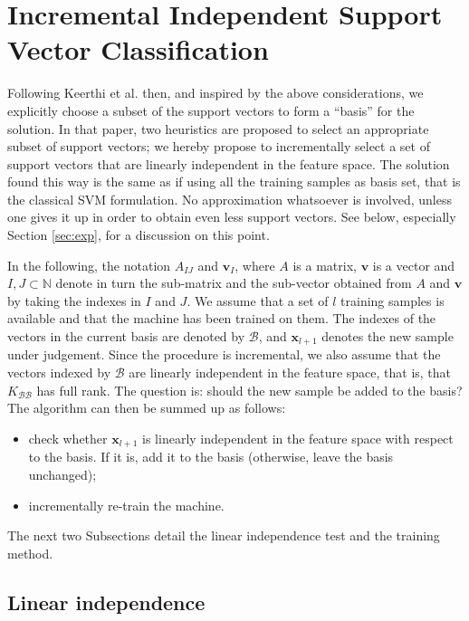 \documentclass[10pt,twocolumn,letterpaper]{article}
\def\NN{\mathbb{N}}
\def\xx{\mathbf{x}}
\def\b{\mathcal{B}}
\begin{document}
\section{Incremental Independent Support Vector Classification}
\label{sec:opt}

Following Keerthi et al. \cite{KeerthiCDC06} then, and inspired by the
above considerations, we explicitly choose a subset of the support
vectors to form a ``basis'' for the solution. In that paper, two
heuristics are proposed to select an appropriate subset of support
vectors; we hereby propose to incrementally select a set of support
vectors that are linearly independent in the feature space. The
solution found this way is the same as if using all the training
samples as basis set, that is the classical SVM formulation. No
approximation whatsoever is involved, unless one gives it up in order
to obtain even less support vectors. See below, especially Section
\ref{sec:exp}, for a discussion on this point.

In the following, the notation $A_{IJ}$ and $\mathbf{v}_I$, where $A$
is a matrix, $\mathbf{v}$ is a vector and $I,J \subset \NN$ denote in
turn the sub-matrix and the sub-vector obtained from $A$ and
$\mathbf{v}$ by taking the indexes in $I$ and $J$. We assume that a
set of $l$ training samples is available and that the machine has been
trained on them. The indexes of the vectors in the current basis are
denoted by $\b$, and $\xx_{l+1}$ denotes the new sample under
judgement. Since the procedure is incremental, we also assume that the
vectors indexed by $\b$ are linearly independent in the feature space,
that is, that $K_{\b\b}$ has full rank. The question is: should the
new sample be added to the basis? The algorithm can then be summed up
as follows:

\begin{itemize}

  \item check whether $\xx_{l+1}$ is linearly independent in the
        feature space with respect to the basis. If it is, add it to
        the basis (otherwise, leave the basis unchanged);

  \item incrementally re-train the machine.

\end{itemize}

The next two Subsections detail the linear independence test and the
training method.

\subsection{Linear independence}
\end{document}
